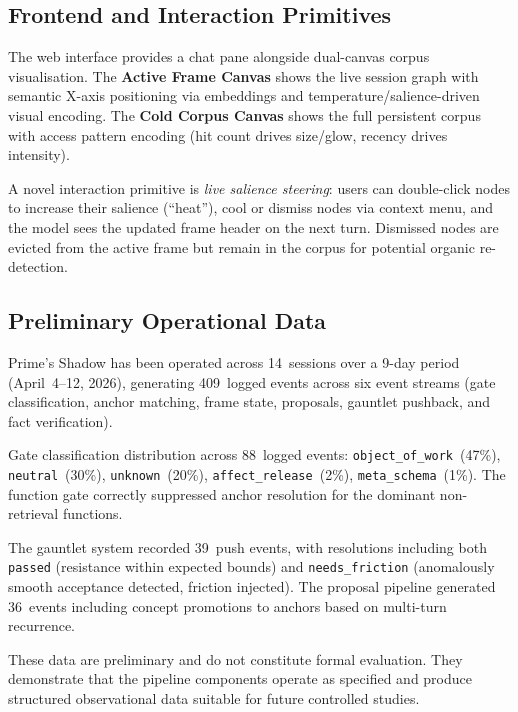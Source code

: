 \documentclass[11pt,a4paper]{article}
\begin{document}
\subsection{Frontend and Interaction Primitives}

The web interface provides a chat pane alongside dual-canvas corpus visualisation.
The \textbf{Active Frame Canvas} shows the live session graph with semantic X-axis positioning via embeddings and temperature/salience-driven visual encoding.
The \textbf{Cold Corpus Canvas} shows the full persistent corpus with access pattern encoding (hit count drives size/glow, recency drives intensity).

A novel interaction primitive is \emph{live salience steering}: users can double-click nodes to increase their salience (``heat''), cool or dismiss nodes via context menu, and the model sees the updated frame header on the next turn.
Dismissed nodes are evicted from the active frame but remain in the corpus for potential organic re-detection.

\subsection{Preliminary Operational Data}
\label{sec:operational}

Prime's Shadow has been operated across 14~sessions over a 9-day period (April~4--12, 2026), generating 409~logged events across six event streams (gate classification, anchor matching, frame state, proposals, gauntlet pushback, and fact verification).

Gate classification distribution across 88~logged events: \texttt{object\_of\_work}~(47\%), \texttt{neutral}~(30\%), \texttt{unknown}~(20\%), \texttt{affect\_release}~(2\%), \texttt{meta\_schema}~(1\%).
The function gate correctly suppressed anchor resolution for the dominant non-retrieval functions.

The gauntlet system recorded 39~push events, with resolutions including both \texttt{passed} (resistance within expected bounds) and \texttt{needs\_friction} (anomalously smooth acceptance detected, friction injected).
The proposal pipeline generated 36~events including concept promotions to anchors based on multi-turn recurrence.

These data are preliminary and do not constitute formal evaluation.
They demonstrate that the pipeline components operate as specified and produce structured observational data suitable for future controlled studies.
\end{document}
